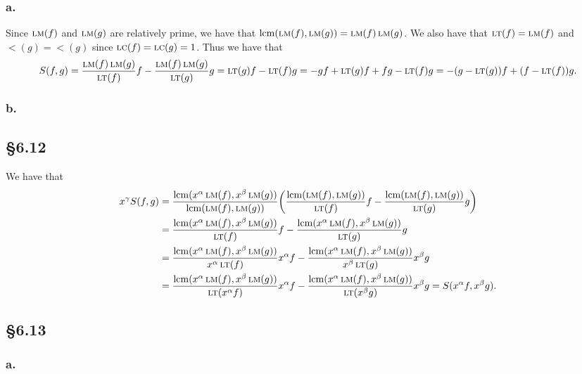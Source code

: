 \documentclass[letterpaper]{article}
\begin{document}
\subsubsection*{a.}

Since $\operatorname{\textsc{lm}}(f)$ and $\operatorname{\textsc{lm}}(g)$ are relatively prime, we have that $\operatorname{lcm}(\operatorname{\textsc{lm}}(f), \operatorname{\textsc{lm}}(g)) = \operatorname{\textsc{lm}}(f) \operatorname{\textsc{lm}}(g)$.
We also have that $\operatorname{\textsc{lt}}(f) = \operatorname{\textsc{lm}}(f)$ and $\lt(g) = \lt(g)$ since $\operatorname{\textsc{lc}}(f) = \operatorname{\textsc{lc}}(g) = 1$.
Thus we have that
\[
  S(f, g) = \frac{\operatorname{\textsc{lm}}(f)\operatorname{\textsc{lm}}(g)}{\operatorname{\textsc{lt}}(f)}f - \frac{\operatorname{\textsc{lm}}(f)\operatorname{\textsc{lm}}(g)}{\operatorname{\textsc{lt}}(g)}g = \operatorname{\textsc{lt}}(g)f - \operatorname{\textsc{lt}}(f)g = -gf + \operatorname{\textsc{lt}}(g)f +fg - \operatorname{\textsc{lt}}(f)g = -(g - \operatorname{\textsc{lt}}(g))f + (f - \operatorname{\textsc{lt}}(f))g.
\]

\subsubsection*{b.}


\subsection*{\S 6.12}

We have that
\begin{align*}
  x^{\gamma} S(f, g) &= \frac{\lcm(x^{\alpha}\lm(f), x^{\beta} \lm(g))}{\lcm(\lm(f), \lm(g))} \pqty{\frac{\lcm(\lm(f), \lm(g))}{\lt(f)}f - \frac{\lcm(\lm(f), \lm(g))}{\lt(g)} g} \\
 &= \frac{\lcm(x^{\alpha}\lm(f), x^{\beta} \lm(g))}{\lt(f)}f - \frac{\lcm(x^{\alpha}\lm(f), x^{\beta} \lm(g))}{\lt(g)} g \\
                     &= \frac{\lcm(x^{\alpha}\lm(f), x^{\beta} \lm(g))}{x^{\alpha}\lt(f)}x^{\alpha}f - \frac{\lcm(x^{\alpha}\lm(f), x^{\beta} \lm(g))}{x^{\beta}\lt(g)}x^{\beta}g \\
                     &= \frac{\lcm(x^{\alpha}\lm(f), x^{\beta} \lm(g))}{\lt(x^{\alpha}f)}x^{\alpha}f - \frac{\lcm(x^{\alpha}\lm(f), x^{\beta} \lm(g))}{\lt(x^{\beta}g)}x^{\beta}g = S(x^{\alpha}f, x^{\beta}g).
\end{align*}

\subsection*{\S 6.13}

\subsubsection*{a.}
\end{document}
